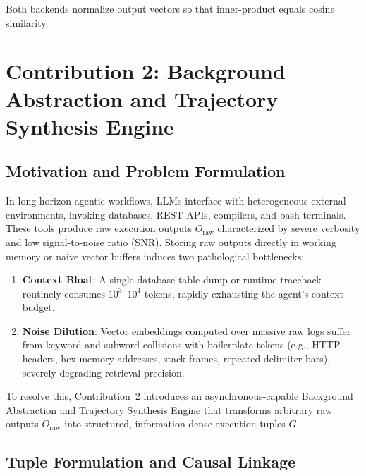 \documentclass[lettersize,journal]{IEEEtran}
\begin{document}
Both backends normalize output vectors so that inner-product equals cosine similarity.

\section{Contribution 2: Background Abstraction and Trajectory Synthesis Engine}

\subsection{Motivation and Problem Formulation}

In long-horizon agentic workflows, LLMs interface with heterogeneous external environments, invoking databases, REST APIs, compilers, and bash terminals. These tools produce raw execution outputs $O_{\text{raw}}$ characterized by severe verbosity and low signal-to-noise ratio (SNR). Storing raw outputs directly in working memory or naive vector buffers induces two pathological bottlenecks:

\begin{enumerate}
    \item \textbf{Context Bloat}: A single database table dump or runtime traceback routinely consumes $10^3$--$10^4$ tokens, rapidly exhausting the agent's context budget.
    \item \textbf{Noise Dilution}: Vector embeddings computed over massive raw logs suffer from keyword and subword collisions with boilerplate tokens (e.g., HTTP headers, hex memory addresses, stack frames, repeated delimiter bars), severely degrading retrieval precision.
\end{enumerate}

To resolve this, Contribution~2 introduces an asynchronous-capable Background Abstraction and Trajectory Synthesis Engine that transforms arbitrary raw outputs $O_{\text{raw}}$ into structured, information-dense execution tuples $G$.

\subsection{Tuple Formulation and Causal Linkage}
\end{document}
